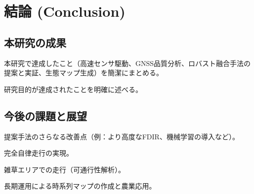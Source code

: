 \documentclass[main]{subfiles}
\begin{document}
\chapter{結論 (Conclusion)}

\section{本研究の成果}
本研究で達成したこと（高速センサ駆動、GNSS品質分析、ロバスト融合手法の提案と実証、生態マップ生成）を簡潔にまとめる。

研究目的が達成されたことを明確に述べる。

\section{今後の課題と展望}
提案手法のさらなる改善点（例：より高度なFDIR、機械学習の導入など）。

完全自律走行の実現。

雑草エリアでの走行（可通行性解析）。

長期運用による時系列マップの作成と農業応用。
\end{document}
